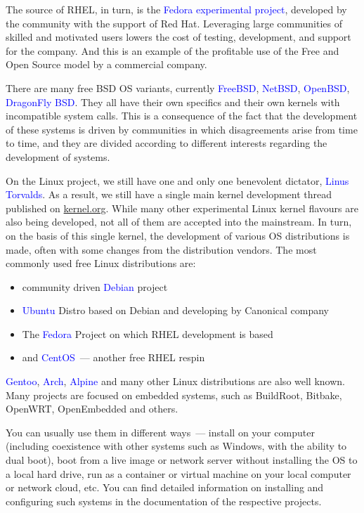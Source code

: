 \documentclass[12pt]{report}
\newcommand{\struct}[1]{\textcolor{blue}{#1}}
\begin{document}
\medskip
The source of RHEL, in turn, is the \struct{Fedora experimental project},
developed by the community with the support of Red Hat. Leveraging large
communities of skilled and motivated users lowers the cost of testing,
development, and support for the company. And this is an example of the
profitable use of the Free and Open Source model by a commercial company.

\medskip
There are many free BSD OS variants, currently \struct{FreeBSD}, \struct{NetBSD},
\struct{OpenBSD}, \struct{DragonFly BSD}. They all have their own specifics and
their own kernels with incompatible system calls. This is a consequence of
the fact that the development of these systems is driven by communities in
which disagreements arise from time to time, and they are divided according to
different interests regarding the development of systems.

\medskip
On the Linux project, we still have one and only one benevolent dictator,
\struct{Linus Torvalds}. As a result, we still have a single main kernel
development thread published on \url{kernel.org}. While many other experimental
Linux kernel flavours are also being developed, not all of them are
accepted into the mainstream. In turn, on the basis of this single
kernel, the development of various OS distributions is made, often with
some changes from the distribution vendors.
The most commonly used free Linux distributions are:
\begin{itemize}
\item community driven \struct{Debian} project
\item \struct{Ubuntu} Distro based on Debian and developing by Canonical company
\item The \struct{Fedora} Project on which RHEL development is based
\item and \struct{CentOS}~--- another free RHEL respin
\end{itemize}
\struct{Gentoo}, \struct{Arch}, \struct{Alpine} and many other Linux
distributions are also well known. Many projects are focused on embedded
systems, such as BuildRoot, Bitbake, OpenWRT, OpenEmbedded and others.

\medskip
You can usually use them in different ways~--- install on your computer
(including coexistence with other systems such as Windows, with the ability
to dual boot), boot from a live image or network server without
installing the OS to a local hard drive, run as a container or virtual
machine on your local computer or network cloud, etc. You can find
detailed information on installing and configuring such systems in
the documentation of the respective projects.
\end{document}
